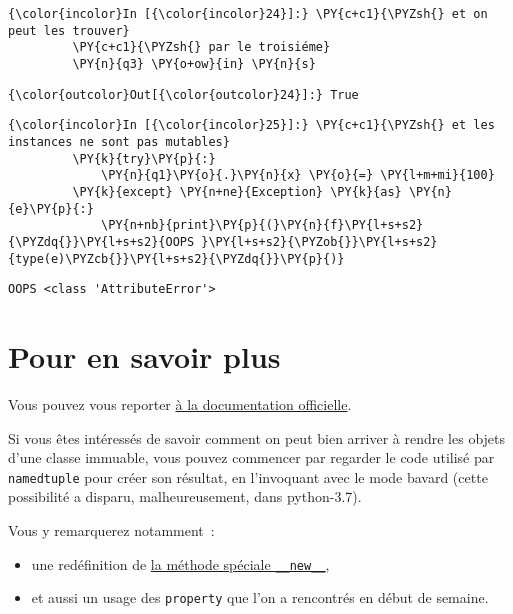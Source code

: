     \begin{Verbatim}[commandchars=\\\{\}]
{\color{incolor}In [{\color{incolor}24}]:} \PY{c+c1}{\PYZsh{} et on peut les trouver}
         \PY{c+c1}{\PYZsh{} par le troisiéme}
         \PY{n}{q3} \PY{o+ow}{in} \PY{n}{s}
\end{Verbatim}


\begin{Verbatim}[commandchars=\\\{\}]
{\color{outcolor}Out[{\color{outcolor}24}]:} True
\end{Verbatim}
            
    \begin{Verbatim}[commandchars=\\\{\}]
{\color{incolor}In [{\color{incolor}25}]:} \PY{c+c1}{\PYZsh{} et les instances ne sont pas mutables}
         \PY{k}{try}\PY{p}{:}
             \PY{n}{q1}\PY{o}{.}\PY{n}{x} \PY{o}{=} \PY{l+m+mi}{100}
         \PY{k}{except} \PY{n+ne}{Exception} \PY{k}{as} \PY{n}{e}\PY{p}{:}
             \PY{n+nb}{print}\PY{p}{(}\PY{n}{f}\PY{l+s+s2}{\PYZdq{}}\PY{l+s+s2}{OOPS }\PY{l+s+s2}{\PYZob{}}\PY{l+s+s2}{type(e)\PYZcb{}}\PY{l+s+s2}{\PYZdq{}}\PY{p}{)}
\end{Verbatim}


    \begin{Verbatim}[commandchars=\\\{\}]
OOPS <class 'AttributeError'>

    \end{Verbatim}

    \hypertarget{pour-en-savoir-plus}{%
\section{Pour en savoir plus}\label{pour-en-savoir-plus}}

    Vous pouvez vous reporter
\href{https://docs.python.org/3/library/collections.html\#collections.namedtuple}{à
la documentation officielle}.

    Si vous êtes intéressés de savoir comment on peut bien arriver à rendre
les objets d'une classe immuable, vous pouvez commencer par regarder le
code utilisé par \texttt{namedtuple} pour créer son résultat, en
l'invoquant avec le mode bavard (cette possibilité a disparu,
malheureusement, dans python-3.7).

Vous y remarquerez notamment~:

\begin{itemize}
\item
  une redéfinition de
  \href{https://docs.python.org/3/reference/datamodel.html\#object.__new__}{la
  méthode spéciale \texttt{\_\_new\_\_}},
\item
  et aussi un usage des \texttt{property} que l'on a rencontrés en début
  de semaine.
\end{itemize}

